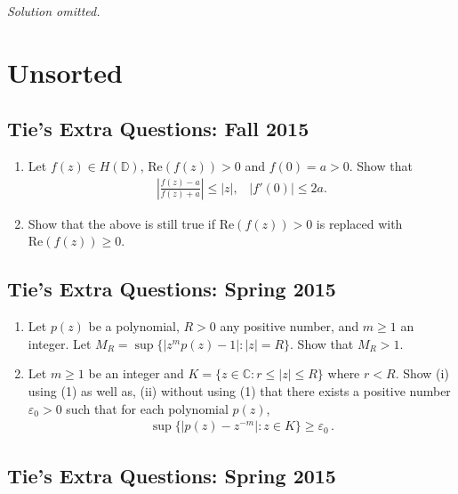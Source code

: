 \emph{Solution omitted.}

\hypertarget{unsorted-1}{%
\section{Unsorted}\label{unsorted-1}}

\hypertarget{ties-extra-questions-fall-2015-4}{%
\subsection{Tie's Extra Questions: Fall
2015}\label{ties-extra-questions-fall-2015-4}}

\begin{enumerate}
\def\labelenumi{\arabic{enumi}.}
\item
  Let \(f(z) \in H({\mathbb D})\), \(\text{Re}(f(z)) >0\) and
  \(f(0)= a>0\). Show that
  \begin{align*}
  {\left\lvert { \frac{f(z)-a}{f(z)+a}} \right\rvert} \leq |z|, \; \; \; |f'(0)| \leq 2a
  .\end{align*}
\item
  Show that the above is still true if \(\text{Re}(f(z)) >0\) is
  replaced with \(\text{Re}(f(z)) \geq 0\).
\end{enumerate}

\hypertarget{ties-extra-questions-spring-2015-10}{%
\subsection{Tie's Extra Questions: Spring
2015}\label{ties-extra-questions-spring-2015-10}}

\begin{enumerate}
\def\labelenumi{(\arabic{enumi})}
\item
  Let \(p(z)\) be a polynomial, \(R>0\) any positive number, and
  \(m \geq 1\) an integer. Let
  \(M_R = \sup \{ |z^{m} p(z) - 1|: |z| = R \}\). Show that \(M_R>1\).
\item
  Let \(m \geq 1\) be an integer and
  \(K = \{z \in {\mathbb C}: r \leq |z| \leq R \}\) where \(r<R\). Show
  (i) using (1) as well as, (ii) without using (1) that there exists a
  positive number \(\varepsilon_0>0\) such that for each polynomial
  \(p(z)\),
  \begin{align*}\sup \{|p(z) - z^{-m}|: z \in K  \} \geq \varepsilon_0 \, .\end{align*}
\end{enumerate}

\hypertarget{ties-extra-questions-spring-2015-11}{%
\subsection{Tie's Extra Questions: Spring
2015}\label{ties-extra-questions-spring-2015-11}}

